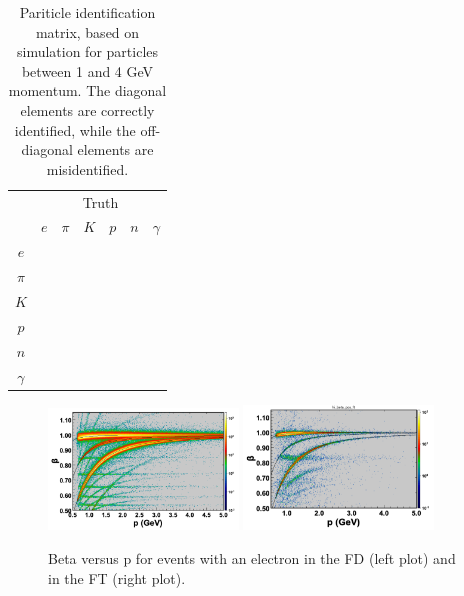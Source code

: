 \documentclass[3p,times,twocolumn]{elsarticle}
\begin{document}
\begin{table}[htpb]
  \begin{center}
    \label{tab:pidmatrix}
    \begin{tabular}{|c|cccccc|}\hline
          & \multicolumn{6}{|c|}{Truth}\\        
          & $e$ & $\pi$ & $K$ & $p$ & $n$ & $\gamma$ \\\hline
  $e$     &     &       &     &     &     &          \\ 
  $\pi$   &     &       &     &     &     &          \\ 
  $K$     &     &       &     &     &     &          \\ 
  $p$     &     &       &     &     &     &          \\ 
  $n$     &     &       &     &     &     &          \\ 
 $\gamma$ &     &       &     &     &     &          \\\hline 
    \end{tabular}
  \caption{Pariticle identification matrix, based on simulation for particles between 1 and 4 GeV momentum.  The diagonal elements are correctly identified, while the off-diagonal elements are misidentified.}
  \end{center}
\end{table}

\vspace{1in}
\begin{figure}
\includegraphics[width=0.45\textwidth]{pics/betavsp1.png}
\includegraphics[width=0.45\textwidth]{pics/betavsp2.png}
\caption{Beta versus p for events with an electron in the FD (left plot) and in the FT (right plot).
}
\label{fig:betavsp}
\end{figure}
\end{document}
